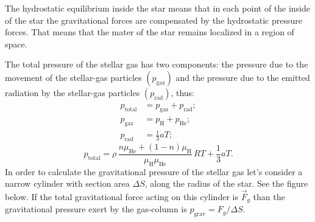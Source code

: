 The hydrostatic equilibrium inside the star means that in each point of the
inside of the star the gravitational forces are compensated by the hydrostatic
pressure forces. That means that the mater of the star remains localized in a
region of space.

The total pressure of the stellar gas has two components: the pressure due to
the movement of the stellar-gas particles $\left(p_{\mathrm{gaz}}\right)$ and
the pressure due to the emitted radiation by the stellar-gas particles
$\left(p_{\mathrm{rad}}\right)$, thus:
\begin{align*}
  p_{\mathrm{total}} &= p_{\mathrm{gaz}} + p_{\mathrm{rad}}; \\
  p_{\mathrm{gaz}} &= p_{\mathrm{H}} + p_{\mathrm{He}}; \\
  p_{\mathrm{rad}} &= \frac{1}{3}aT; %
\end{align*}
\[
  p_{\mathrm{total}}
  = \rho\,\frac{n\mu_{\mathrm{He}} + (1-n)\mu_{\mathrm{H}}}{\mu_{\mathrm{H}}\mu_{\mathrm{He}}}\,RT
    + \frac{1}{3}aT. \tag{1}
\]
In order to calculate the gravitational pressure of the stellar gas let's
consider a narrow cylinder with section area $\Delta S$, along the radius of
the star. See the figure below. If the total gravitational force acting on this
cylinder is $\vec{F}_g$ than the gravitational pressure exert by the
gas-column is $p_{\mathrm{grav}} = F_g/\Delta S$.

